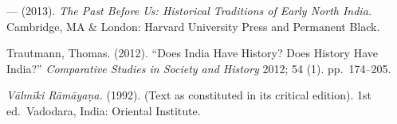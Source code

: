 \begin{thebibliography}{99}
  — (2013). \textit{The Past Before Us: Historical Traditions of Early North India.} Cambridge, MA \& London: Harvard University Press and Permanent Black.

  Trautmann, Thomas. (2012). “Does India Have History? Does History Have India?” \textit{Comparative Studies in Society and History} 2012; 54 (1). pp.~174--205.

  \textit{Vālmīki Rāmāyaṇa.} (1992). (Text as constituted in its critical edition). 1st ed.\ Vadodara, India: Oriental Institute.

 \end{thebibliography}

\theendnotes

